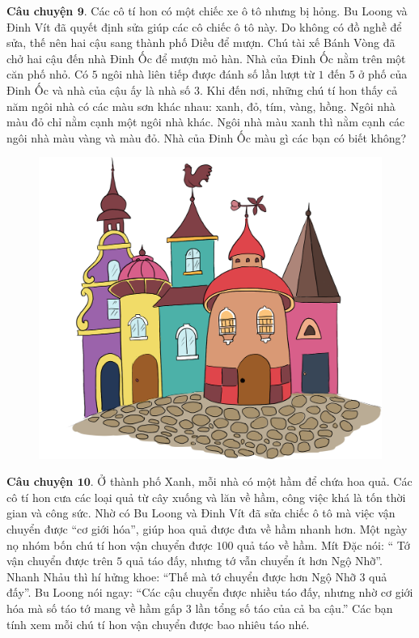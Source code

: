 	\vskip 0.1cm
	\textbf{\color{toancuabi}Câu chuyện $\pmb{9.}$} Các cô tí hon có một chiếc xe ô tô nhưng bị hỏng. Bu Loong và Đinh Vít đã quyết định sửa giúp các cô chiếc ô tô này. Do  không có đồ nghề để sửa, thế nên hai cậu sang thành phố Diều để mượn. Chú tài xế Bánh Vòng đã chở hai cậu đến nhà Đinh Ốc để mượn mỏ hàn. Nhà của Đinh Ốc nằm trên một căn phố nhỏ. Có $5$ ngôi nhà liên tiếp được đánh số lần lượt từ $1$ đến $5$ ở phố của Đinh Ốc và nhà của cậu ấy là nhà số $3$. Khi đến nơi, những chú tí hon thấy cả năm ngôi nhà có các màu sơn khác nhau: xanh, đỏ, tím, vàng, hồng. Ngôi nhà màu đỏ chỉ nằm cạnh một ngôi nhà khác. Ngôi nhà màu xanh thì nằm cạnh các ngôi nhà màu vàng và màu đỏ. Nhà của Đinh Ốc màu gì các bạn có biết không?
		\begin{figure}[H]
		\centering
		\vspace*{-5pt}
		\captionsetup{labelformat= empty, justification=centering}
		\includegraphics[width=0.6\linewidth]{Hinh24_NhaDinhOc}
		\vspace*{-10pt}
	\end{figure}
	\textbf{\color{toancuabi}Câu chuyện $\pmb{10.}$} Ở thành phố Xanh, mỗi nhà có một hầm để chứa hoa quả. Các cô tí hon cưa các loại quả từ cây xuống và lăn về hầm, công việc khá là tốn thời gian và công sức. Nhờ có Bu Loong và Đinh Vít đã sửa chiếc ô tô mà việc vận chuyển được “cơ giới hóa”, giúp hoa quả được đưa về hầm nhanh hơn. Một ngày nọ nhóm bốn chú tí hon vận chuyển được $100$ quả táo về hầm. Mít Đặc nói: “ Tớ vận chuyển được trên $5$ quả táo đấy, nhưng tớ vẫn chuyển ít hơn Ngộ Nhỡ”. Nhanh Nhảu thì hí hửng khoe: “Thế mà tớ chuyển được hơn Ngộ Nhỡ $3$ quả đấy”. Bu Loong nói ngay: “Các cậu chuyển được nhiều táo đấy, nhưng nhờ cơ giới hóa mà số táo tớ mang về hầm gấp $3$ lần tổng số táo của cả ba cậu.” Các bạn tính xem mỗi chú tí hon vận chuyển được bao nhiêu táo nhé.
